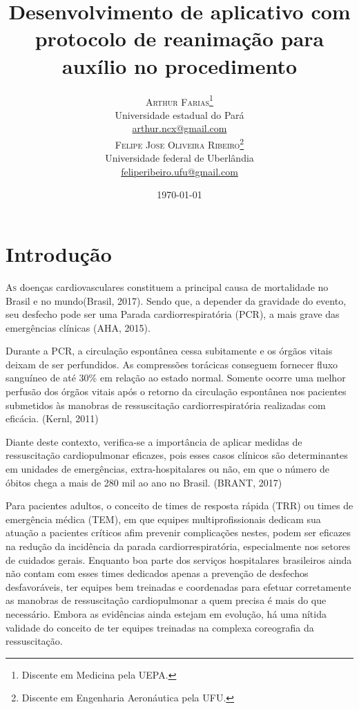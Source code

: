 \documentclass[twoside,twocolumn]{article}
\title{Desenvolvimento de aplicativo com protocolo de reanimação para auxílio no procedimento} %
\author{%
\textsc{Arthur Farias}\thanks{Discente em Medicina pela UEPA.} \\ %
\normalsize Universidade estadual do Pará \\ %
\normalsize \href{mailto:arthur.ncx@gmail.com}{arthur.ncx@gmail.com} \\[1ex]%
\textsc{Felipe Jose Oliveira Ribeiro}\thanks{Discente em Engenharia Aeronáutica pela UFU.} \\ %
\normalsize Universidade federal de Uberlândia \\ %
\normalsize \href{mailto:feliperibeiro.ufu@gmail.com}{feliperibeiro.ufu@gmail.com} %
}
\date{\today} %
\begin{document}
\maketitle


\section{Introdução}
\lettrine[nindent=0em,lines=3]{A}s doenças cardiovasculares constituem a principal causa de mortalidade no Brasil e no mundo(Brasil, 2017). Sendo que, a depender da gravidade do evento, seu desfecho pode ser uma Parada cardiorrespiratória (PCR), a mais grave das emergências clínicas (AHA, 2015).

Durante a PCR, a circulação espontânea cessa subitamente e os órgãos vitais deixam de ser perfundidos. As compressões torácicas conseguem fornecer fluxo sanguíneo de até 30\% em relação  ao estado normal. Somente ocorre uma melhor perfusão dos órgãos vitais após o retorno da  circulação espontânea nos pacientes submetidos às manobras de ressuscitação cardiorrespiratória  realizadas com eficácia. (Kernl, 2011)

Diante deste contexto, verifica-se a importância de aplicar medidas de ressuscitação cardiopulmonar eficazes, pois esses casos clínicos são determinantes em unidades de emergências, extra-hospitalares ou não, em que o número de óbitos chega a mais de 280 mil ao ano no Brasil. (BRANT, 2017)

Para pacientes adultos, o conceito de times de resposta rápida (TRR) ou times de emergência médica (TEM), em que equipes multiprofissionais dedicam sua atuação a pacientes críticos afim  prevenir complicações nestes, podem ser eficazes na redução da incidência da parada cardiorrespiratória, especialmente nos setores de cuidados gerais. Enquanto boa parte dos serviços hospitalares brasileiros ainda não contam com esses times dedicados apenas a prevenção de  desfechos desfavoráveis, ter equipes bem treinadas e coordenadas para efetuar corretamente as manobras de ressuscitação cardiopulmonar a quem precisa é mais do que necessário. Embora as evidências ainda estejam em evolução, há uma nítida validade do conceito de ter equipes treinadas na complexa coreografia da ressuscitação.
\end{document}
